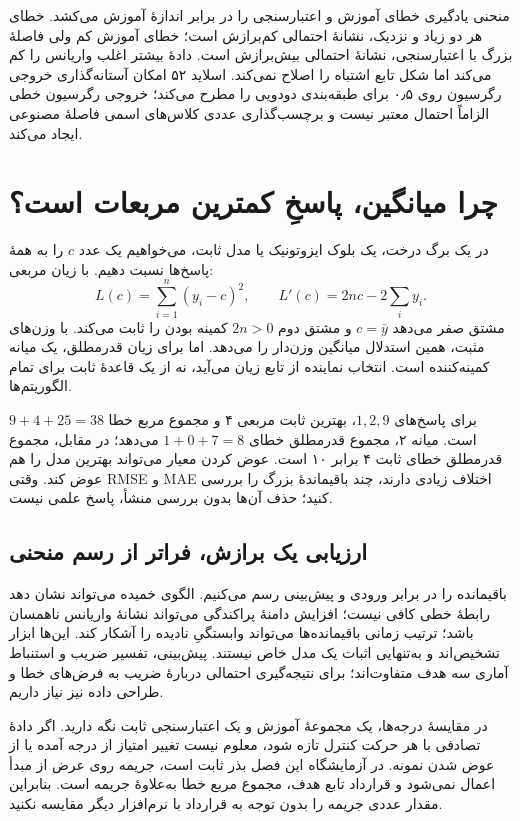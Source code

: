 \documentclass[12pt,a4paper,oneside]{report}
\begin{document}
منحنی یادگیری خطای آموزش و اعتبارسنجی را در برابر اندازهٔ آموزش می‌کشد. خطای هر دو زیاد و نزدیک، نشانهٔ احتمالی کم‌برازش است؛ خطای آموزش کم ولی فاصلهٔ بزرگ با اعتبارسنجی، نشانهٔ احتمالی بیش‌برازش است. دادهٔ بیشتر اغلب واریانس را کم می‌کند اما شکل تابع اشتباه را اصلاح نمی‌کند. اسلاید ۵۲ امکان آستانه‌گذاری خروجی رگرسیون روی ۰٫۵ برای طبقه‌بندی دودویی را مطرح می‌کند؛ خروجی رگرسیون خطی الزاماً احتمال معتبر نیست و برچسب‌گذاری عددی کلاس‌های اسمی فاصلهٔ مصنوعی ایجاد می‌کند.
\section{چرا میانگین، پاسخِ کمترین مربعات است؟}
در یک برگ درخت، یک بلوک ایزوتونیک یا مدل ثابت، می‌خواهیم یک عدد $c$ را به همهٔ پاسخ‌ها نسبت دهیم. با زیان مربعی:
\[L(c)=\sum_{i=1}^n(y_i-c)^2,\qquad L'(c)=2nc-2\sum_i y_i.\]
مشتق صفر می‌دهد $c=\bar y$ و مشتق دوم $2n>0$ کمینه بودن را ثابت می‌کند. با وزن‌های مثبت، همین استدلال میانگین وزن‌دار را می‌دهد. اما برای زیان قدرمطلق، یک میانه کمینه‌کننده است. انتخاب نماینده از تابع زیان می‌آید، نه از یک قاعدهٔ ثابت برای تمام الگوریتم‌ها.

برای پاسخ‌های $1,2,9$، بهترین ثابت مربعی ۴ و مجموع مربع خطا $9+4+25=38$ است. میانه ۲، مجموع قدرمطلق خطای $1+0+7=8$ می‌دهد؛ در مقابل، مجموع قدرمطلق خطای ثابت ۴ برابر ۱۰ است. عوض کردن معیار می‌تواند بهترین مدل را هم عوض کند. وقتی RMSE و MAE اختلاف زیادی دارند، چند باقیماندهٔ بزرگ را بررسی کنید؛ حذف آن‌ها بدون بررسی منشأ، پاسخ علمی نیست.

\subsection*{ارزیابی یک برازش، فراتر از رسم منحنی}
باقیمانده را در برابر ورودی و پیش‌بینی رسم می‌کنیم. الگوی خمیده می‌تواند نشان دهد رابطهٔ خطی کافی نیست؛ افزایش دامنهٔ پراکندگی می‌تواند نشانهٔ واریانس ناهمسان باشد؛ ترتیب زمانی باقیمانده‌ها می‌تواند وابستگیِ نادیده را آشکار کند. این‌ها ابزار تشخیص‌اند و به‌تنهایی اثبات یک مدل خاص نیستند. پیش‌بینی، تفسیر ضریب و استنباط آماری سه هدف متفاوت‌اند؛ برای نتیجه‌گیری احتمالی دربارهٔ ضریب به فرض‌های خطا و طراحی داده نیز نیاز داریم.

در مقایسهٔ درجه‌ها، یک مجموعهٔ آموزش و یک اعتبارسنجی ثابت نگه دارید. اگر دادهٔ تصادفی با هر حرکت کنترل تازه شود، معلوم نیست تغییر امتیاز از درجه آمده یا از عوض شدن نمونه. در آزمایشگاه این فصل بذر ثابت است، جریمه روی عرض از مبدأ اعمال نمی‌شود و قرارداد تابع هدف، مجموع مربع خطا به‌علاوهٔ جریمه است. بنابراین مقدار عددی جریمه را بدون توجه به قرارداد با نرم‌افزار دیگر مقایسه نکنید.
\end{document}

